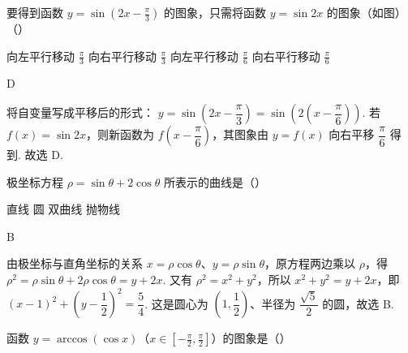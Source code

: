 \begin{problem}

要得到函数 \(y = \sin \left(2x - \frac{\pi}{3}\right)\) 的图象，只需将函数 \(y = \sin 2x\) 的图象（如图）（\quad）

\choices
    {向左平行移动 \(\frac{\pi}{3}\)}
    {向右平行移动 \(\frac{\pi}{3}\)}
    {向左平行移动 \(\frac{\pi}{6}\)}
    {向右平行移动 \(\frac{\pi}{6}\)}
\end{problem}

\begin{answer}
D
\end{answer}

\begin{solution}
将自变量写成平移后的形式：
\(y=\sin\left(2x-\dfrac{\pi}{3}\right)=\sin\left(2\left(x-\dfrac{\pi}{6}\right)\right)\). 若 \(f(x)=\sin2x\)，则新函数为 \(f\left(x-\dfrac{\pi}{6}\right)\)，其图象由 \(y=f(x)\) 向右平移 \(\dfrac{\pi}{6}\) 得到. 故选 D.
\end{solution}

\begin{problem}

极坐标方程 \(\rho = \sin \theta + 2\cos \theta\) 所表示的曲线是（\quad）

\choices
    {直线}
    {圆}
    {双曲线}
    {抛物线}
\end{problem}

\begin{answer}
B
\end{answer}

\begin{solution}
由极坐标与直角坐标的关系 \(x=\rho\cos\theta\)、\(y=\rho\sin\theta\)，原方程两边乘以 \(\rho\)，得
\(\rho^2=\rho\sin\theta+2\rho\cos\theta=y+2x\). 又有 \(\rho^2=x^2+y^2\)，所以
\(x^2+y^2=y+2x\)，即
\(\left(x-1\right)^2+\left(y-\dfrac12\right)^2=\dfrac54\).
这是圆心为 \(\left(1,\dfrac12\right)\)、半径为 \(\dfrac{\sqrt5}{2}\) 的圆，故选 B.
\end{solution}

\begin{problem}

函数 \(y = \arccos(\cos x)\)（\(x \in \left[-\frac{\pi}{2}, \frac{\pi}{2}\right]\)）的图象是（\quad）

    {}
    {}
    {}
\end{problem}

